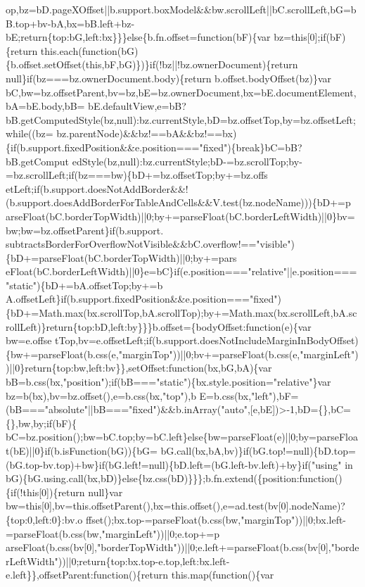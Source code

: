 \begin{DoxyCode}
{      op,bz=bD.pageXOffset||b.support.boxModel&&bw.scrollLeft||bC.scrollLeft,bG=bB.top+bv-bA,bx=bB.left+bz-bE;return\{top:bG,left:bx\}\}\}else\{b.fn.offset=function(bF)\{var bz=this[0];if(bF)\{return
       this.each(function(bG)\{b.offset.setOffset(this,bF,bG)\})\}if(!bz||!bz.ownerDocument)\{return null\}if(bz===bz.ownerDocument.body)\{return
       b.offset.bodyOffset(bz)\}var
       bC,bw=bz.offsetParent,bv=bz,bE=bz.ownerDocument,bx=bE.documentElement,bA=bE.body,bB=
      bE.defaultView,e=bB?bB.getComputedStyle(bz,null):bz.currentStyle,bD=bz.offsetTop,by=bz.offsetLeft;while((bz=
      bz.parentNode)&&bz!==bA&&bz!==bx)\{if(b.support.fixedPosition&&e.position==="fixed")\{break\}bC=bB?bB.getComput
      edStyle(bz,null):bz.currentStyle;bD-=bz.scrollTop;by-=bz.scrollLeft;if(bz===bw)\{bD+=bz.offsetTop;by+=bz.offs
      etLeft;if(b.support.doesNotAddBorder&&!(b.support.doesAddBorderForTableAndCells&&V.test(bz.nodeName)))\{bD+=p
      arseFloat(bC.borderTopWidth)||0;by+=parseFloat(bC.borderLeftWidth)||0\}bv=bw;bw=bz.offsetParent\}if(b.support.
      subtractsBorderForOverflowNotVisible&&bC.overflow!=="visible")\{bD+=parseFloat(bC.borderTopWidth)||0;by+=pars
      eFloat(bC.borderLeftWidth)||0\}e=bC\}if(e.position==="relative"||e.position==="static")\{bD+=bA.offsetTop;by+=b
      A.offsetLeft\}if(b.support.fixedPosition&&e.position==="fixed")\{bD+=Math.max(bx.scrollTop,bA.scrollTop);by+=Math.max(bx.scrollLeft,bA.scrollLeft)\}return\{top:bD,left:by\}\}\}b.offset=\{bodyOffset:function(e)\{var
       bw=e.offse
      tTop,bv=e.offsetLeft;if(b.support.doesNotIncludeMarginInBodyOffset)\{bw+=parseFloat(b.css(e,"marginTop"))||0;bv+=parseFloat(b.css(e,"marginLeft"))||0\}return\{top:bw,left:bv\}\},setOffset:function(bx,bG,bA)\{var
       bB=b.css(bx,"position");if(bB==="static")\{bx.style.position="relative"\}var
       bz=b(bx),bv=bz.offset(),e=b.css(bx,"top"),b
      E=b.css(bx,"left"),bF=(bB==="absolute"||bB==="fixed")&&b.inArray("auto",[e,bE])>-1,bD=\{\},bC=\{\},bw,by;if(bF)\{
      bC=bz.position();bw=bC.top;by=bC.left\}else\{bw=parseFloat(e)||0;by=parseFloat(bE)||0\}if(b.isFunction(bG))\{bG=
      bG.call(bx,bA,bv)\}if(bG.top!=null)\{bD.top=(bG.top-bv.top)+bw\}if(bG.left!=null)\{bD.left=(bG.left-bv.left)+by\}if("using" in
       bG)\{bG.using.call(bx,bD)\}else\{bz.css(bD)\}\}\};b.fn.extend(\{position:function()\{if(!this[0])\{return null\}var
       bw=this[0],bv=this.offsetParent(),bx=this.offset(),e=ad.test(bv[0].nodeName)?\{top:0,left:0\}:bv.o
      ffset();bx.top-=parseFloat(b.css(bw,"marginTop"))||0;bx.left-=parseFloat(b.css(bw,"marginLeft"))||0;e.top+=p
      arseFloat(b.css(bv[0],"borderTopWidth"))||0;e.left+=parseFloat(b.css(bv[0],"borderLeftWidth"))||0;return\{top:bx.top-e.top,left:bx.left-e.left\}\},offsetParent:function()\{return this.map(function()\{var
}
\end{DoxyCode}
